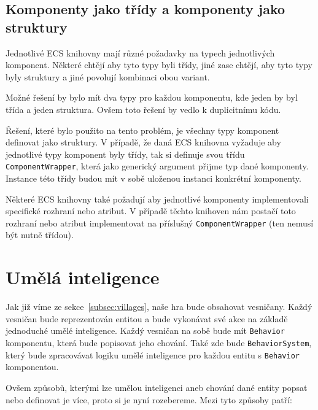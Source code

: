 \subsection{Komponenty jako třídy a komponenty jako struktury}
Jednotlivé ECS knihovny mají různé požadavky na typech jednotlivých komponent. Některé chtějí aby tyto typy byli třídy, jiné zase chtějí, aby tyto typy byly struktury a jiné povolují kombinaci obou variant.

Možné řešení by bylo mít dva typy pro každou komponentu, kde jeden by byl třída a jeden struktura. Ovšem toto řešení by vedlo k duplicitnímu kódu.

Řešení, které bylo použito na tento problém, je všechny typy komponent definovat jako struktury. V případě, že daná ECS knihovna vyžaduje aby jednotlivé typy komponent byly třídy, tak si definuje svou třídu \texttt{ComponentWrapper}, která jako generický argument přijme typ dané komponenty. Instance této třídy budou mít v sobě uloženou instanci konkrétní komponenty.

Některé ECS knihovny také požadují aby jednotlivé komponenty implementovali specifické rozhraní nebo atribut. V případě těchto knihoven nám postačí toto rozhraní nebo atribut implementovat na příslušný \texttt{ComponentWrapper} (ten nemusí být nutně třídou).


\section{Umělá inteligence}
Jak již víme ze sekce~\ref{subsec:villages}, naše hra bude obsahovat vesničany. Každý vesničan bude reprezentován entitou a bude vykonávat své akce na základě jednoduché umělé inteligence. Každý vesničan na sobě bude mít \texttt{Behavior} komponentu, která bude popisovat jeho chování. Také zde bude \texttt{BehaviorSystem}, který bude zpracovávat logiku umělé inteligence pro každou entitu s \texttt{Behavior} komponentou.

Ovšem způsobů, kterými lze umělou inteligenci aneb chování dané entity popsat nebo definovat je více, proto si je nyní rozebereme. Mezi tyto způsoby patří:


